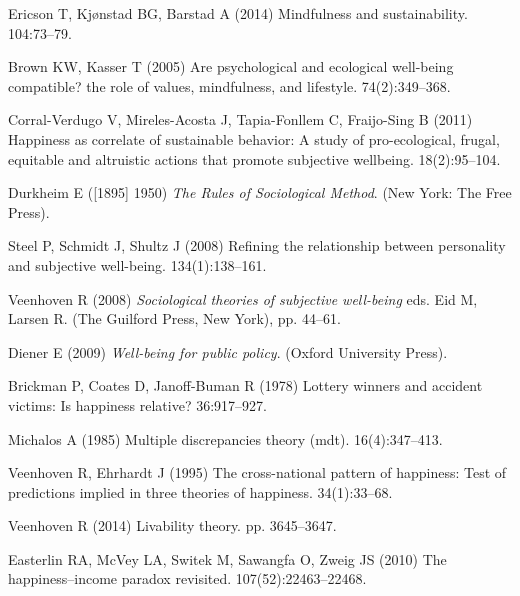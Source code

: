 \documentclass[10pt, letterpaper]{article}
\begin{document}
\begin{spacing}{1.4}
\begin{thebibliography}{10}
Ericson T, Kj{\o}nstad BG, Barstad A (2014) Mindfulness and sustainability.
 104:73--79.

Brown KW, Kasser T (2005) Are psychological and ecological well-being
  compatible? the role of values, mindfulness, and lifestyle.
 74(2):349--368.

Corral-Verdugo V, Mireles-Acosta J, Tapia-Fonllem C, Fraijo-Sing B (2011)
  Happiness as correlate of sustainable behavior: A study of pro-ecological,
  frugal, equitable and altruistic actions that promote subjective wellbeing.
 18(2):95--104.

Durkheim E ([1895] 1950) {\em The Rules of Sociological Method}.
\newblock (New York: The Free Press).

Steel P, Schmidt J, Shultz J (2008) Refining the relationship between
  personality and subjective well-being.
 134(1):138--161.

Veenhoven R (2008) {\em Sociological theories of subjective well-being} eds.{}
  Eid M, Larsen R.
\newblock (The Guilford Press, New York), pp. 44--61.

Diener E (2009) {\em Well-being for public policy}.
\newblock (Oxford University Press).

Brickman P, Coates D, Janoff-Buman R (1978) Lottery winners and accident
  victims: Is happiness relative?
 36:917--927.

Michalos A (1985) Multiple discrepancies theory (mdt).
 16(4):347--413.

Veenhoven R, Ehrhardt J (1995) The cross-national pattern of happiness: Test of
  predictions implied in three theories of happiness.
 34(1):33--68.

Veenhoven R (2014) Livability theory.
 pp.
  3645--3647.

Easterlin RA, McVey LA, Switek M, Sawangfa O, Zweig JS (2010) The
  happiness--income paradox revisited.
  107(52):22463--22468.


\end{thebibliography}
\end{spacing}
\end{document}
